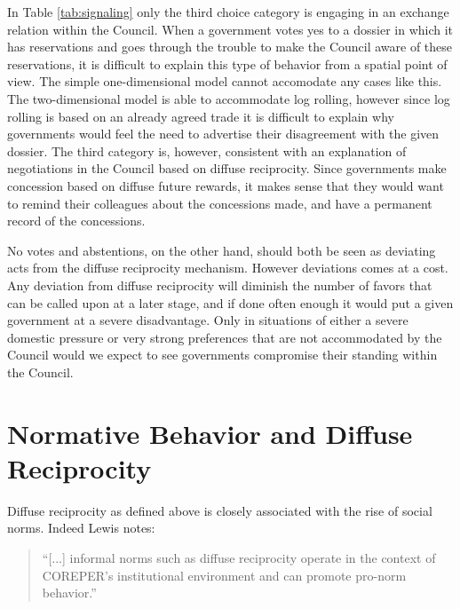 In Table \ref{tab:signaling} only the third choice category is engaging in an exchange relation within the Council. When a government votes yes to a dossier in which it has reservations and goes through the trouble to make the Council aware of these reservations, it is difficult to explain this type of behavior from a spatial point of view. The simple one-dimensional model cannot accomodate any cases like this. The two-dimensional model is able to accommodate log rolling, however since log rolling is based on an already agreed trade it is difficult to explain why governments would feel the need to advertise their disagreement with the given dossier. The third category is, however, consistent with an explanation of negotiations in the Council based on diffuse reciprocity. Since governments make concession based on diffuse future rewards, it makes sense that they would want to remind their colleagues about the concessions made, and have a permanent record of the concessions. 
 
No votes and abstentions, on the other hand, should both be seen as deviating acts from the diffuse reciprocity mechanism. However deviations comes at a cost. Any deviation from diffuse reciprocity will diminish the number of favors that can be called upon at a later stage, and if done often enough it would put a given government at a severe disadvantage. Only in situations of either a severe domestic pressure or very strong preferences that are not accommodated by the Council would we expect to see governments compromise their standing within the Council. 


\section{Normative Behavior and Diffuse Reciprocity}

Diffuse reciprocity as defined above is closely associated with the rise of social norms. Indeed Lewis notes:

\begin{quote}
  ``[...] informal norms such as diffuse reciprocity operate in the context of COREPER's institutional environment and can promote pro-norm behavior.''
\end{quote}

